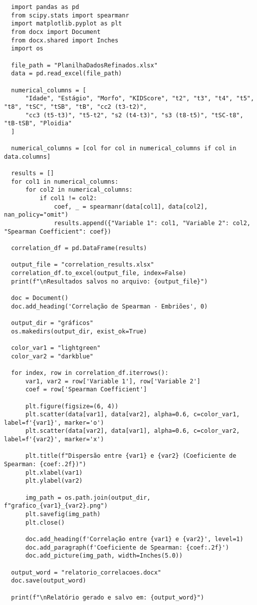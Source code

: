 \begin{lstlisting}
  import pandas as pd
  from scipy.stats import spearmanr
  import matplotlib.pyplot as plt
  from docx import Document
  from docx.shared import Inches
  import os
  
  file_path = "PlanilhaDadosRefinados.xlsx"
  data = pd.read_excel(file_path)
  
  numerical_columns = [ 
      "Idade", "Estágio", "Morfo", "KIDScore", "t2", "t3", "t4", "t5", "t8", "tSC", "tSB", "tB", "cc2 (t3-t2)", 
      "cc3 (t5-t3)", "t5-t2", "s2 (t4-t3)", "s3 (t8-t5)", "tSC-t8", "tB-tSB", "Ploidia"
  ]
  
  numerical_columns = [col for col in numerical_columns if col in data.columns]
  
  results = []
  for col1 in numerical_columns:
      for col2 in numerical_columns:
          if col1 != col2:  
              coef, _ = spearmanr(data[col1], data[col2], nan_policy="omit")
              results.append({"Variable 1": col1, "Variable 2": col2, "Spearman Coefficient": coef})
  
  correlation_df = pd.DataFrame(results)
  
  output_file = "correlation_results.xlsx"
  correlation_df.to_excel(output_file, index=False)
  print(f"\nResultados salvos no arquivo: {output_file}")
  
  doc = Document()
  doc.add_heading('Correlação de Spearman - Embriões', 0)
  
  output_dir = "gráficos"
  os.makedirs(output_dir, exist_ok=True)
  
  color_var1 = "lightgreen"
  color_var2 = "darkblue"
  
  for index, row in correlation_df.iterrows():
      var1, var2 = row['Variable 1'], row['Variable 2']
      coef = row['Spearman Coefficient']
  
      plt.figure(figsize=(6, 4))
      plt.scatter(data[var1], data[var2], alpha=0.6, c=color_var1, label=f'{var1}', marker='o')
      plt.scatter(data[var2], data[var1], alpha=0.6, c=color_var2, label=f'{var2}', marker='x')
      
      plt.title(f"Dispersão entre {var1} e {var2} (Coeficiente de Spearman: {coef:.2f})")
      plt.xlabel(var1)
      plt.ylabel(var2)
  
      img_path = os.path.join(output_dir, f"grafico_{var1}_{var2}.png")
      plt.savefig(img_path)
      plt.close()
  
      doc.add_heading(f'Correlação entre {var1} e {var2}', level=1)
      doc.add_paragraph(f'Coeficiente de Spearman: {coef:.2f}')
      doc.add_picture(img_path, width=Inches(5.0))
  
  output_word = "relatorio_correlacoes.docx"
  doc.save(output_word)
  
  print(f"\nRelatório gerado e salvo em: {output_word}")
\end{lstlisting}

